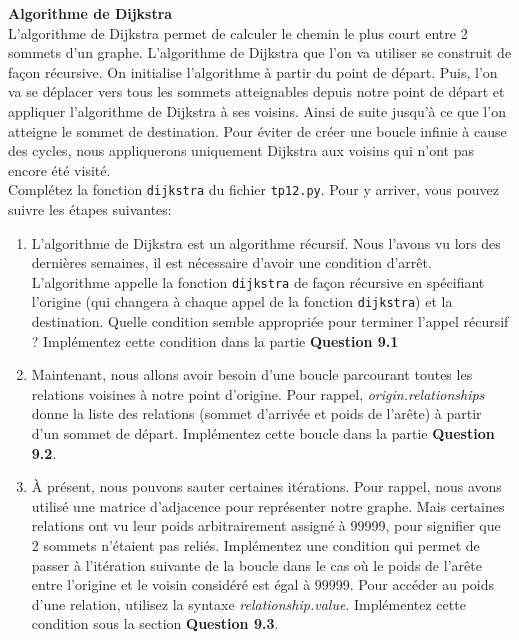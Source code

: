 \begin{Exercice}[15 minutes] \textbf{Algorithme de Dijkstra \optionnel}\\
    L'algorithme de Dijkstra permet de calculer le chemin le plus court entre 2 sommets d'un graphe. L'algorithme de Dijkstra que l'on va utiliser se construit de façon récursive. On initialise l'algorithme à partir du point de départ. Puis, l'on va se déplacer vers tous les sommets atteignables depuis notre point de départ et appliquer l'algorithme de Dijkstra à ses voisins. Ainsi de suite jusqu'à ce que l'on atteigne le sommet de destination. Pour éviter de créer une boucle infinie à cause des cycles, nous appliquerons uniquement Dijkstra aux voisins qui n'ont pas encore été visité.\\
    
    Complétez la fonction \lstinline{dijkstra} du fichier \lstinline{tp12.py}. Pour y arriver, vous pouvez suivre les étapes suivantes:
    \begin{enumerate}
        \item L'algorithme de Dijkstra est un algorithme récursif. Nous l'avons vu lors des dernières semaines, il est nécessaire d'avoir une condition d'arrêt. L'algorithme appelle la fonction \lstinline{dijkstra} de façon récursive en spécifiant l'origine (qui changera à chaque appel de la fonction \lstinline{dijkstra}) et la destination. Quelle condition semble appropriée pour terminer l'appel récursif ? Implémentez cette condition dans la partie \textbf{Question 9.1}
        
        \item Maintenant, nous allons avoir besoin d'une boucle parcourant toutes les relations voisines à notre point d'origine. Pour rappel, \textit{origin.relationships} donne la liste des relations (sommet d'arrivée et poids de l'arête) à partir d'un sommet de départ. Implémentez cette boucle dans la partie \textbf{Question 9.2}.
        
        \item À présent, nous pouvons sauter certaines itérations. Pour rappel, nous avons utilisé une matrice d'adjacence pour représenter notre graphe. Mais certaines relations ont vu leur poids arbitrairement assigné à 99999, pour signifier que 2 sommets n'étaient pas reliés. Implémentez une condition qui permet de passer à l'itération suivante de la boucle dans le cas où le poids de l'arête entre l'origine et le voisin considéré est égal à 99999. Pour accéder au poids d'une relation, utilisez la syntaxe \textit{relationship.value}. Implémentez cette condition sous la section \textbf{Question 9.3}.
        

\end{enumerate}
\end{Exercice}
